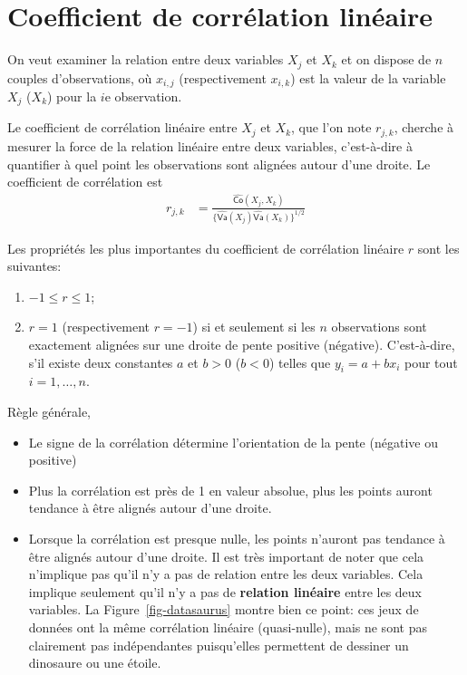 \documentclass[
  11pt,
  letterpaper,
]{scrbook}
\providecommand{\tightlist}{%
  \setlength{\itemsep}{0pt}\setlength{\parskip}{0pt}}\usepackage{longtable,booktabs,array}
\theoremstyle{definition}
\theoremstyle{remark}
\begin{document}
\hypertarget{coefficient-de-corruxe9lation-linuxe9aire}{%
\section{Coefficient de corrélation
linéaire}\label{coefficient-de-corruxe9lation-linuxe9aire}}

On veut examiner la relation entre deux variables \(X_j\) et \(X_k\) et
on dispose de \(n\) couples d'observations, où \(x_{i, j}\)
(respectivement \(x_{i, k}\)) est la valeur de la variable \(X_j\)
(\(X_k\)) pour la \(i\)e observation.

Le coefficient de corrélation linéaire entre \(X_j\) et \(X_k\), que
l'on note \(r_{j, k}\), cherche à mesurer la force de la relation
linéaire entre deux variables, c'est-à-dire à quantifier à quel point
les observations sont alignées autour d'une droite. Le coefficient de
corrélation est \begin{align*}
r_{j, k} &= \frac{\widehat{\mathsf{Co}}(X_j, X_k)}{\{\widehat{\mathsf{Va}}(X_j) \widehat{\mathsf{Va}}(X_k)\}^{1/2}} 
\end{align*}

Les propriétés les plus importantes du coefficient de corrélation
linéaire \(r\) sont les suivantes:

\begin{enumerate}
\def\labelenumi{\arabic{enumi})}
\tightlist
\item
  \(-1 \leq r \leq 1\);
\item
  \(r=1\) (respectivement \(r=-1\)) si et seulement si les \(n\)
  observations sont exactement alignées sur une droite de pente positive
  (négative). C'est-à-dire, s'il existe deux constantes \(a\) et \(b>0\)
  (\(b<0\)) telles que \(y_i=a+b x_i\) pour tout \(i=1, \ldots, n\).
\end{enumerate}

Règle générale,

\begin{itemize}
\tightlist
\item
  Le signe de la corrélation détermine l'orientation de la pente
  (négative ou positive)
\item
  Plus la corrélation est près de 1 en valeur absolue, plus les points
  auront tendance à être alignés autour d'une droite.
\item
  Lorsque la corrélation est presque nulle, les points n'auront pas
  tendance à être alignés autour d'une droite. Il est très important de
  noter que cela n'implique pas qu'il n'y a pas de relation entre les
  deux variables. Cela implique seulement qu'il n'y a pas de
  \textbf{relation linéaire} entre les deux variables. La
  Figure~\ref{fig-datasaurus} montre bien ce point: ces jeux de données
  ont la même corrélation linéaire (quasi-nulle), mais ne sont pas
  clairement pas indépendantes puisqu'elles permettent de dessiner un
  dinosaure ou une étoile.
\end{itemize}
\end{document}

